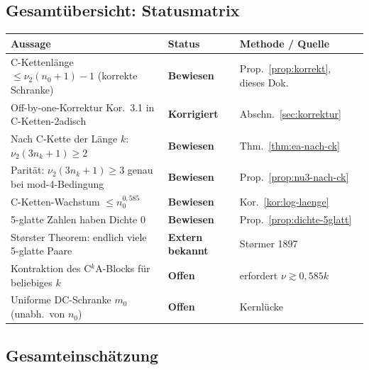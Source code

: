 \documentclass[12pt,a4paper]{article}
\newcommand{\vii}{\nu_2}
\begin{document}
\subsection{Gesamtübersicht: Statusmatrix}

\begin{center}
\renewcommand{\arraystretch}{1.5}
\begin{tabular}{p{7.5cm} p{2.5cm} p{3.5cm}}
\toprule
\textbf{Aussage} & \textbf{Status} & \textbf{Methode / Quelle} \\
\midrule
C-Kettenlänge $\leq \vii(n_0+1)-1$ (korrekte Schranke)
  & \textcolor{bewiesengrün}{\bfseries Bewiesen} & Prop.~\ref{prop:korrekt}, dieses Dok. \\
Off-by-one-Korrektur Kor.~3.1 in C-Ketten-2adisch
  & \textcolor{bewiesengrün}{\bfseries Korrigiert} & Abschn.~\ref{sec:korrektur} \\
Nach C-Kette der Länge $k$: $\vii(3n_k+1)\geq 2$
  & \textcolor{bewiesengrün}{\bfseries Bewiesen} & Thm.~\ref{thm:ea-nach-ck} \\
Parität: $\vii(3n_k+1)\geq 3$ genau bei mod-4-Bedingung
  & \textcolor{bewiesengrün}{\bfseries Bewiesen} & Prop.~\ref{prop:nu3-nach-ck} \\
C-Ketten-Wachstum $\leq n_0^{0{,}585}$
  & \textcolor{bewiesengrün}{\bfseries Bewiesen} & Kor.~\ref{kor:log-laenge} \\
5-glatte Zahlen haben Dichte $0$
  & \textcolor{bewiesengrün}{\bfseries Bewiesen} & Prop.~\ref{prop:dichte-5glatt} \\
Størster Theorem: endlich viele 5-glatte Paare
  & \textcolor{bewiesengrün}{\bfseries Extern bekannt} & Størmer 1897 \\
Kontraktion des C$^k$A-Blocks für beliebiges $k$
  & \textcolor{lückenrot}{\bfseries Offen} & erfordert $\nu \gtrsim 0{,}585k$ \\
Uniforme DC-Schranke $m_0$ (unabh.\ von $n_0$)
  & \textcolor{lückenrot}{\bfseries Offen} & Kernlücke \\
\bottomrule
\end{tabular}
\end{center}

\subsection{Gesamteinschätzung}
\end{document}
